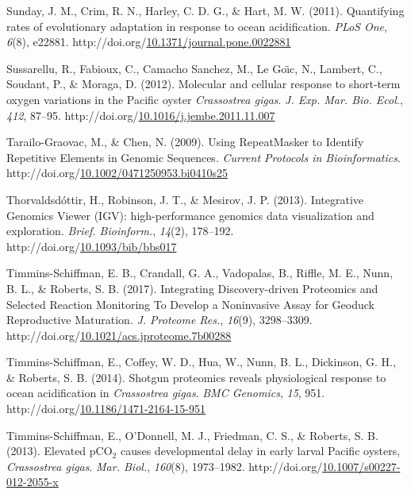 \documentclass [11pt, proquest] {uwthesis}[2015/03/03]
\newlength{\cslhangindent}
\newenvironment{CSLReferences}%
{\setlength{\parindent}{0pt}%
\everypar{\setlength{\hangindent}{\cslhangindent}}\ignorespaces}%
{\par}
\begin{document}
\begin{CSLReferences}{1}{0}
\leavevmode\hypertarget{ref-Sunday2011}{}%
Sunday, J. M., Crim, R. N., Harley, C. D. G., \& Hart, M. W. (2011). {Quantifying rates of evolutionary adaptation in response to ocean acidification}. \emph{PLoS One}, \emph{6}(8), e22881. http://doi.org/\href{https://doi.org/10.1371/journal.pone.0022881}{10.1371/journal.pone.0022881}

\leavevmode\hypertarget{ref-Sussarellu2012}{}%
Sussarellu, R., Fabioux, C., Camacho Sanchez, M., Le Goı̈c, N., Lambert, C., Soudant, P., \& Moraga, D. (2012). {Molecular and cellular response to short-term oxygen variations in the Pacific oyster \emph{Crassostrea gigas}}. \emph{J. Exp. Mar. Bio. Ecol.}, \emph{412}, 87--95. http://doi.org/\href{https://doi.org/10.1016/j.jembe.2011.11.007}{10.1016/j.jembe.2011.11.007}

\leavevmode\hypertarget{ref-Tarailo-Graovac2009}{}%
Tarailo-Graovac, M., \& Chen, N. (2009). {Using RepeatMasker to Identify Repetitive Elements in Genomic Sequences}. \emph{Current Protocols in Bioinformatics}. http://doi.org/\href{https://doi.org/10.1002/0471250953.bi0410s25}{10.1002/0471250953.bi0410s25}

\leavevmode\hypertarget{ref-Thorvaldsdottir2013}{}%
Thorvaldsdóttir, H., Robinson, J. T., \& Mesirov, J. P. (2013). {Integrative Genomics Viewer (IGV): high-performance genomics data visualization and exploration}. \emph{Brief. Bioinform.}, \emph{14}(2), 178--192. http://doi.org/\href{https://doi.org/10.1093/bib/bbs017}{10.1093/bib/bbs017}

\leavevmode\hypertarget{ref-Timmins-Schiffman2017}{}%
Timmins-Schiffman, E. B., Crandall, G. A., Vadopalas, B., Riffle, M. E., Nunn, B. L., \& Roberts, S. B. (2017). {Integrating Discovery-driven Proteomics and Selected Reaction Monitoring To Develop a Noninvasive Assay for Geoduck Reproductive Maturation}. \emph{J. Proteome Res.}, \emph{16}(9), 3298--3309. http://doi.org/\href{https://doi.org/10.1021/acs.jproteome.7b00288}{10.1021/acs.jproteome.7b00288}

\leavevmode\hypertarget{ref-Timmins-Schiffman2014}{}%
Timmins-Schiffman, E., Coffey, W. D., Hua, W., Nunn, B. L., Dickinson, G. H., \& Roberts, S. B. (2014). {Shotgun proteomics reveals physiological response to ocean acidification in \emph{Crassostrea gigas}}. \emph{BMC Genomics}, \emph{15}, 951. http://doi.org/\href{https://doi.org/10.1186/1471-2164-15-951}{10.1186/1471-2164-15-951}

\leavevmode\hypertarget{ref-Timmins-Schiffman2013}{}%
Timmins-Schiffman, E., O'Donnell, M. J., Friedman, C. S., \& Roberts, S. B. (2013). {Elevated {pCO\(_2\)} causes developmental delay in early larval Pacific oysters, \emph{Crassostrea gigas}}. \emph{Mar. Biol.}, \emph{160}(8), 1973--1982. http://doi.org/\href{https://doi.org/10.1007/s00227-012-2055-x}{10.1007/s00227-012-2055-x}


\end{CSLReferences}
\end{document}
